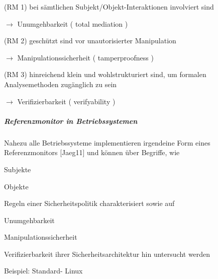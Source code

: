 \documentclass[a4paper]{article}
\begin{document}
\begin{multicols}{3}
    \begin{itemize*}
        \item
        (RM 1) bei sämtlichen Subjekt/Objekt-Interaktionen involviert sind
        \begin{itemize*}
            \item $\rightarrow$  Unumgehbarkeit ( total mediation )
        \end{itemize*}
        \item
        (RM 2) geschützt sind vor unautorisierter Manipulation
        \begin{itemize*}
            \item $\rightarrow$  Manipulationssicherheit ( tamperproofness )
        \end{itemize*}
        \item
        (RM 3) hinreichend klein und wohlstrukturiert sind, um formalen
        Analysemethoden zugänglich zu sein
        \begin{itemize*}
            \item $\rightarrow$  Verifizierbarkeit ( verifyability )
        \end{itemize*}
    \end{itemize*}


    \subparagraph{Referenzmonitor in
        Betriebssystemen}

    Nahezu alle Betriebssysteme implementieren irgendeine Form eines
    Referenzmonitors {[}Jaeg11{]} und können über Begriffe, wie

    \begin{itemize*}
        \item
        Subjekte
        \item
        Objekte
        \item
        Regeln einer Sicherheitspolitik charakterisiert sowie auf
        \item
        Unumgehbarkeit
        \item
        Manipulationssicherheit
        \item
        Verifizierbarkeit ihrer Sicherheitsarchitektur hin untersucht werden
    \end{itemize*}

    Beispiel: Standard- Linux


\end{multicols}
\end{document}
